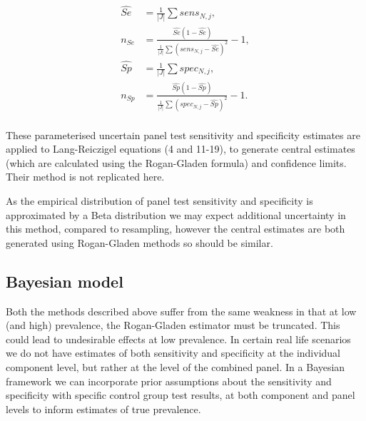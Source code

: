 \documentclass[a4paper, 12pt, twoside]{article}
\let\Oldsubsection\subsection
\renewcommand{\subsection}{\FloatBarrier\Oldsubsection}
\begin{document}
\begin{equation*}
\begin{aligned}
\widehat{Se} &= \frac{1}{|J|}\sum{sens_{N,j}},\\
n_{Se} &= \frac{
\widehat{Se}(1-\widehat{Se})
}{
\frac{1}{|J|}\sum{(sens_{N,j}-\widehat{Se})^2}
}-1,\\
\widehat{Sp} &= \frac{1}{|J|}\sum{spec_{N,j}},\\
n_{Sp} &= \frac{
\widehat{Sp}(1-\widehat{Sp})
}{
\frac{1}{|J|}\sum{(spec_{N,j}-\widehat{Sp})^2}
}-1.\\
\end{aligned}
\end{equation*}

These parameterised uncertain panel test sensitivity and specificity estimates are applied to Lang-Reiczigel equations (4 and 11-19)\cite{lang2014}, to generate central estimates (which are calculated using the Rogan-Gladen formula) and confidence limits. Their method is not replicated here.

As the empirical distribution of panel test sensitivity and specificity is approximated by a Beta distribution we may expect additional uncertainty in this method, compared to resampling, however the central estimates are both generated using Rogan-Gladen methods so should be similar.

\subsection{Bayesian model}

Both the methods described above suffer from the same weakness in that at low (and high) prevalence, the Rogan-Gladen estimator must be truncated. This could lead to undesirable effects at low prevalence. In certain real life scenarios we do not have estimates of both sensitivity and specificity at the individual component level, but rather at the level of the combined panel. In a Bayesian framework we can incorporate prior assumptions about the sensitivity and specificity with specific control group test results, at both component and panel levels to inform estimates of true prevalence.
\end{document}
